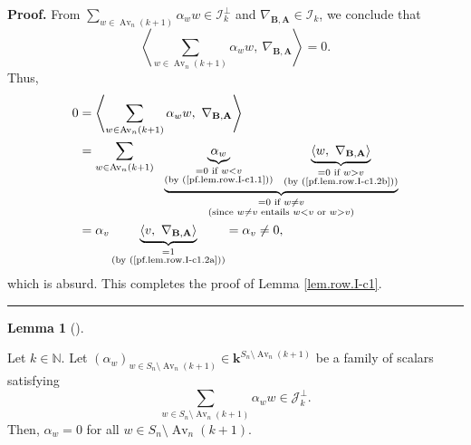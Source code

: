 \documentclass[numbers=enddot,12pt,final,onecolumn,notitlepage]{scrartcl}%
\numberwithin{exer}{subsection}
\theoremstyle{definition}
\newtheorem{lem}[theo]{Lemma}
\newenvironment{lemma}[1][]
{\begin{lem}[#1]\begin{leftbar}}
{\end{leftbar}\end{lem}}
\newenvironment{proof}[1][Proof]{\noindent\textbf{#1.} }{\ \rule{0.5em}{0.5em}}
\let\sumnonlimits\sum
\renewcommand{\sum}{\sumnonlimits\limits}
\begin{document}
\begin{proof}
From $\sum_{w\in\operatorname*{Av}\nolimits_{n}\left(  k+1\right)  }\alpha
_{w}w\in\mathcal{I}_{k}^{\perp}$ and $\nabla_{\mathbf{B},\mathbf{A}}%
\in\mathcal{I}_{k}$, we conclude that
\[
\left\langle \sum_{w\in\operatorname*{Av}\nolimits_{n}\left(  k+1\right)
}\alpha_{w}w,\ \nabla_{\mathbf{B},\mathbf{A}}\right\rangle =0.
\]
Thus,%
\begin{align*}
0  &  =\left\langle \sum_{w\in\operatorname*{Av}\nolimits_{n}\left(
k+1\right)  }\alpha_{w}w,\ \nabla_{\mathbf{B},\mathbf{A}}\right\rangle \\
&  =\sum_{w\in\operatorname*{Av}\nolimits_{n}\left(  k+1\right)
}\ \ \underbrace{\underbrace{\alpha_{w}}_{\substack{=0\text{ if }%
w<v\\\text{(by (\ref{pf.lem.row.I-c1.1}))}}}\ \ \underbrace{\left\langle
w,\ \nabla_{\mathbf{B},\mathbf{A}}\right\rangle }_{\substack{=0\text{ if
}w>v\\\text{(by (\ref{pf.lem.row.I-c1.2b}))}}}}_{\substack{=0\text{ if }w\neq
v\\\text{(since }w\neq v\text{ entails }w<v\text{ or }w>v\text{)}}}\\
&  =\alpha_{v}\underbrace{\left\langle v,\ \nabla_{\mathbf{B},\mathbf{A}%
}\right\rangle }_{\substack{=1\\\text{(by (\ref{pf.lem.row.I-c1.2a}))}%
}}=\alpha_{v}\neq0,
\end{align*}
which is absurd. This completes the proof of Lemma \ref{lem.row.I-c1}.
\end{proof}

\begin{lemma}
\label{lem.row.J-c1}Let $k\in\mathbb{N}$. Let $\left(  \alpha_{w}\right)
_{w\in S_{n}\setminus\operatorname*{Av}\nolimits_{n}\left(  k+1\right)  }%
\in\mathbf{k}^{S_{n}\setminus\operatorname*{Av}\nolimits_{n}\left(
k+1\right)  }$ be a family of scalars satisfying%
\[
\sum_{w\in S_{n}\setminus\operatorname*{Av}\nolimits_{n}\left(  k+1\right)
}\alpha_{w}w\in\mathcal{J}_{k}^{\perp}.
\]
Then, $\alpha_{w}=0$ for all $w\in S_{n}\setminus\operatorname*{Av}%
\nolimits_{n}\left(  k+1\right)  $.
\end{lemma}
\end{document}
